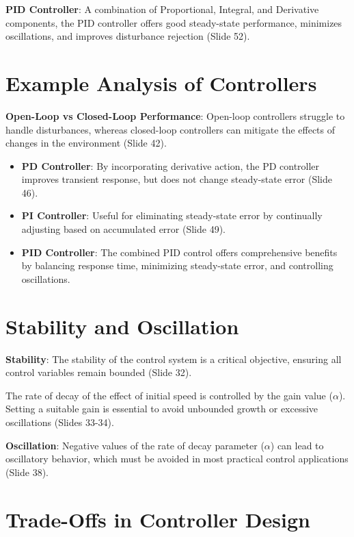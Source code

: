 \documentclass[
  14pt,
  a4paper,
  numbers=noendperiod,
  headinclude=true,
  footinclude=true,
  DIV=calc]{scrreprt}
\begin{document}
\textbf{PID Controller}: A combination of Proportional, Integral, and
Derivative components, the PID controller offers good steady-state
performance, minimizes oscillations, and improves disturbance rejection
(Slide 52).

\section{Example Analysis of
Controllers}\label{example-analysis-of-controllers}

\textbf{Open-Loop vs Closed-Loop Performance}: Open-loop controllers
struggle to handle disturbances, whereas closed-loop controllers can
mitigate the effects of changes in the environment (Slide 42).

\begin{itemize}
\item
  \textbf{PD Controller}: By incorporating derivative action, the PD
  controller improves transient response, but does not change
  steady-state error (Slide 46).
\item
  \textbf{PI Controller}: Useful for eliminating steady-state error by
  continually adjusting based on accumulated error (Slide 49).
\item
  \textbf{PID Controller}: The combined PID control offers comprehensive
  benefits by balancing response time, minimizing steady-state error,
  and controlling oscillations.
\end{itemize}

\section{Stability and Oscillation}\label{stability-and-oscillation}

\textbf{Stability}: The stability of the control system is a critical
objective, ensuring all control variables remain bounded (Slide 32).

The rate of decay of the effect of initial speed is controlled by the
gain value (\(\alpha\)). Setting a suitable gain is essential to avoid
unbounded growth or excessive oscillations (Slides 33-34).

\textbf{Oscillation}: Negative values of the rate of decay parameter
(\(\alpha\)) can lead to oscillatory behavior, which must be avoided in
most practical control applications (Slide 38).

\section{Trade-Offs in Controller
Design}\label{trade-offs-in-controller-design}
\end{document}
